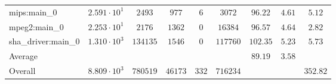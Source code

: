 \begin{tabular}{|l|c|c|c|c|c|c|c|c|}
mips:main\_0            & $ 2.591 \cdot 10^{1} $ & $ 2493   $ & $ 977   $ & $ 6   $ & $ 3072   $ & $ 96.22       $ & $ 4.61    $ & $ 5.12    $ \\
mpeg2:main\_0           & $ 2.253 \cdot 10^{1} $ & $ 2176   $ & $ 1362  $ & $ 0   $ & $ 16384  $ & $ 96.57       $ & $ 4.64    $ & $ 2.82    $ \\
sha\_driver:main\_0     & $ 1.310 \cdot 10^{3} $ & $ 134135 $ & $ 1546  $ & $ 0   $ & $ 117760 $ & $ 102.35      $ & $ 5.23    $ & $ 5.73    $ \\
\hline
Average                 & $                    $ & $        $ & $       $ & $     $ & $        $ & $ 89.19       $ & $ 3.58    $ & $         $ \\
\hline
Overall                 & $ 8.809 \cdot 10^{3} $ & $ 780519 $ & $ 46173 $ & $ 332 $ & $ 716234 $ & $             $ & $         $ & $ 352.82  $ \\
\hline
\end{tabular}

